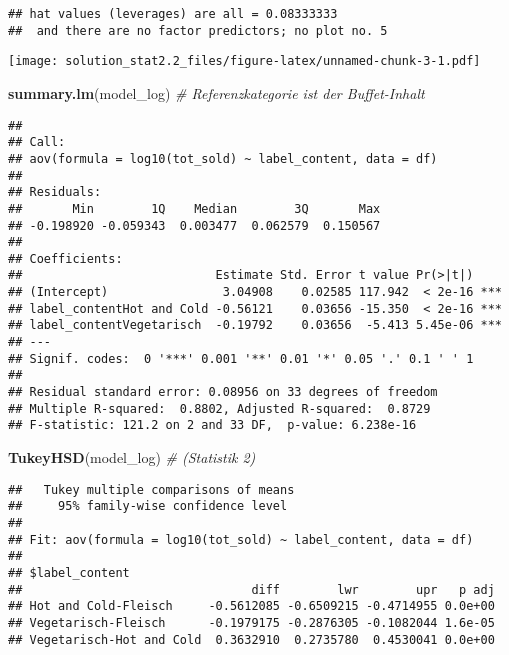 \documentclass[
]{article}
\newenvironment{Shaded}{\begin{snugshade}}{\end{snugshade}}
\newcommand{\CommentTok}[1]{\textcolor[rgb]{0.56,0.35,0.01}{\textit{#1}}}
\newcommand{\KeywordTok}[1]{\textcolor[rgb]{0.13,0.29,0.53}{\textbf{#1}}}
\newcommand{\NormalTok}[1]{#1}
\begin{document}
\begin{verbatim}
## hat values (leverages) are all = 0.08333333
##  and there are no factor predictors; no plot no. 5
\end{verbatim}

\texttt{[image: solution\_stat2.2\_files/figure-latex/unnamed-chunk-3-1.pdf]}

\begin{Shaded}
\begin{Highlighting}[]
\KeywordTok{summary.lm}\NormalTok{(model_log) }\CommentTok{# Referenzkategorie ist der Buffet-Inhalt}
\end{Highlighting}
\end{Shaded}

\begin{verbatim}
## 
## Call:
## aov(formula = log10(tot_sold) ~ label_content, data = df)
## 
## Residuals:
##       Min        1Q    Median        3Q       Max 
## -0.198920 -0.059343  0.003477  0.062579  0.150567 
## 
## Coefficients:
##                           Estimate Std. Error t value Pr(>|t|)    
## (Intercept)                3.04908    0.02585 117.942  < 2e-16 ***
## label_contentHot and Cold -0.56121    0.03656 -15.350  < 2e-16 ***
## label_contentVegetarisch  -0.19792    0.03656  -5.413 5.45e-06 ***
## ---
## Signif. codes:  0 '***' 0.001 '**' 0.01 '*' 0.05 '.' 0.1 ' ' 1
## 
## Residual standard error: 0.08956 on 33 degrees of freedom
## Multiple R-squared:  0.8802, Adjusted R-squared:  0.8729 
## F-statistic: 121.2 on 2 and 33 DF,  p-value: 6.238e-16
\end{verbatim}

\begin{Shaded}
\begin{Highlighting}[]
\KeywordTok{TukeyHSD}\NormalTok{(model_log) }\CommentTok{# (Statistik 2)}
\end{Highlighting}
\end{Shaded}

\begin{verbatim}
##   Tukey multiple comparisons of means
##     95% family-wise confidence level
## 
## Fit: aov(formula = log10(tot_sold) ~ label_content, data = df)
## 
## $label_content
##                                diff        lwr        upr   p adj
## Hot and Cold-Fleisch     -0.5612085 -0.6509215 -0.4714955 0.0e+00
## Vegetarisch-Fleisch      -0.1979175 -0.2876305 -0.1082044 1.6e-05
## Vegetarisch-Hot and Cold  0.3632910  0.2735780  0.4530041 0.0e+00
\end{verbatim}
\end{document}
